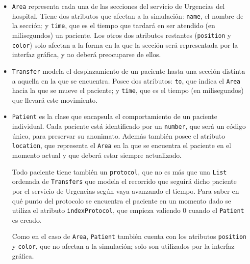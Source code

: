 \documentclass[10pt,a4paper,spanish]{article}
\newcommand{\code}[1]{\texttt{#1}}
\begin{document}
\begin{itemize}
    \item \code{Area} representa cada una de las secciones del servicio de Urgencias del hospital. Tiene dos atributos que afectan a la simulación: \code{name}, el nombre de la sección; y \code{time}, que es el tiempo que tardará en ser atendido (en milisegundos) un paciente. Los otros dos atributos restantes (\code{position} y \code{color}) solo afectan a la forma en la que la sección será representada por la interfaz gráfica, y no deberá preocuparse de ellos.
    \item \code{Transfer} modela el desplazamiento de un paciente hasta una sección distinta a aquella en la que se encuentra. Posee dos atributos: \code{to}, que indica el \code{Area} hacia la que se mueve el paciente; y \code{time}, que es el tiempo (en milisegundos) que llevará este movimiento.
    \item \code{Patient} es la clase que encapsula el comportamiento de un paciente individual. Cada paciente está identificado por un \code{number}, que será un código único, para preservar su anonimato. Además también posee el atributo \code{location}, que representa el \code{Area} en la que se encuentra el paciente en el momento actual y que deberá estar siempre actualizado.

    Todo paciente tiene también un \code{protocol}, que no es más que una \code{List} ordenada de \code{Transfers} que modela el recorrido que seguirá dicho paciente por el servicio de Urgencias según vaya avanzando el tiempo. Para saber en qué punto del protocolo se encuentra el paciente en un momento dado se utiliza el atributo \code{indexProtocol}, que empieza valiendo 0 cuando el \code{Patient} es creado.

    Como en el caso de \code{Area}, \code{Patient} también cuenta con los atributos \code{position} y \code{color}, que no afectan a la simulación; solo son utilizados por la interfaz gráfica.


\end{itemize}
\end{document}
